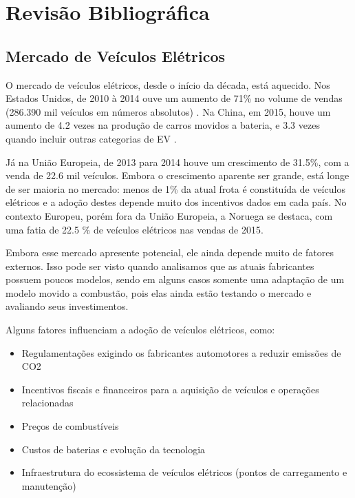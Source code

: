 \chapter{Revisão Bibliográfica}
\label{stateofart}

  \section{Mercado de Veículos Elétricos}
  \label{stateofart:market}

    O mercado de veículos elétricos, desde o início da década, está aquecido. Nos Estados Unidos, de 2010 à 2014 ouve um aumento de 71\% no volume de vendas (286.390 mil veículos em números absolutos) \cite{fsec-report-ev}. Na China, em 2015, houve um aumento de 4.2 vezes na produção de carros movidos a bateria, e 3.3 vezes quando incluir outras categorias de \ac{EV} \cite{caam-report-ev}.

    Já na União Europeia, de 2013 para 2014 houve um crescimento de 31.5\%, com a venda de 22.6 mil veículos. Embora o crescimento aparente ser grande, está longe de ser maioria no mercado: menos de 1\% da atual frota é constituída de veículos elétricos e a adoção destes depende muito dos incentivos dados em cada país. No contexto Europeu, porém fora da União Europeia, a Noruega se destaca, com uma fatia de 22.5 \% de veículos elétricos nas vendas de 2015. \cite{eaa-report-ev}

    Embora esse mercado apresente potencial, ele ainda depende muito de fatores externos. Isso pode ser visto quando analisamos que as atuais fabricantes possuem poucos modelos, sendo em alguns casos somente uma adaptação de um modelo movido a combustão, pois elas ainda estão testando o mercado e avaliando seus investimentos.

    Alguns fatores influenciam a adoção de veículos elétricos, como:

    \begin{itemize}
      \item Regulamentações exigindo os fabricantes automotores a reduzir emissões de CO2
      \item Incentivos fiscais e financeiros para a aquisição de veículos e operações relacionadas
      \item Preços de combustíveis
      \item Custos de baterias e evolução da tecnologia
      \item Infraestrutura do ecossistema de veículos elétricos (pontos de carregamento e manutenção)
    \end{itemize}

